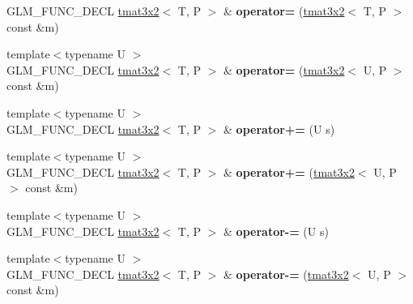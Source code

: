 \begin{DoxyCompactItemize}
\item 
\hypertarget{structglm_1_1detail_1_1tmat3x2_abba3dc67eea8c0f2ceeea5a66b892644}{G\-L\-M\-\_\-\-F\-U\-N\-C\-\_\-\-D\-E\-C\-L \hyperlink{structglm_1_1detail_1_1tmat3x2}{tmat3x2}$<$ T, P $>$ \& {\bfseries operator=} (\hyperlink{structglm_1_1detail_1_1tmat3x2}{tmat3x2}$<$ T, P $>$ const \&m)}\label{structglm_1_1detail_1_1tmat3x2_abba3dc67eea8c0f2ceeea5a66b892644}

\item 
\hypertarget{structglm_1_1detail_1_1tmat3x2_a14a1f4a49d2a1a04fa45935a33c47c3a}{{\footnotesize template$<$typename U $>$ }\\G\-L\-M\-\_\-\-F\-U\-N\-C\-\_\-\-D\-E\-C\-L \hyperlink{structglm_1_1detail_1_1tmat3x2}{tmat3x2}$<$ T, P $>$ \& {\bfseries operator=} (\hyperlink{structglm_1_1detail_1_1tmat3x2}{tmat3x2}$<$ U, P $>$ const \&m)}\label{structglm_1_1detail_1_1tmat3x2_a14a1f4a49d2a1a04fa45935a33c47c3a}

\item 
\hypertarget{structglm_1_1detail_1_1tmat3x2_a41d01c7fbc6061206a33b265ddb9649b}{{\footnotesize template$<$typename U $>$ }\\G\-L\-M\-\_\-\-F\-U\-N\-C\-\_\-\-D\-E\-C\-L \hyperlink{structglm_1_1detail_1_1tmat3x2}{tmat3x2}$<$ T, P $>$ \& {\bfseries operator+=} (U s)}\label{structglm_1_1detail_1_1tmat3x2_a41d01c7fbc6061206a33b265ddb9649b}

\item 
\hypertarget{structglm_1_1detail_1_1tmat3x2_a0ce859a11cdafb33342c159b4a4f145a}{{\footnotesize template$<$typename U $>$ }\\G\-L\-M\-\_\-\-F\-U\-N\-C\-\_\-\-D\-E\-C\-L \hyperlink{structglm_1_1detail_1_1tmat3x2}{tmat3x2}$<$ T, P $>$ \& {\bfseries operator+=} (\hyperlink{structglm_1_1detail_1_1tmat3x2}{tmat3x2}$<$ U, P $>$ const \&m)}\label{structglm_1_1detail_1_1tmat3x2_a0ce859a11cdafb33342c159b4a4f145a}

\item 
\hypertarget{structglm_1_1detail_1_1tmat3x2_a5ee8c2917c7b4e74c626af4cf49fce63}{{\footnotesize template$<$typename U $>$ }\\G\-L\-M\-\_\-\-F\-U\-N\-C\-\_\-\-D\-E\-C\-L \hyperlink{structglm_1_1detail_1_1tmat3x2}{tmat3x2}$<$ T, P $>$ \& {\bfseries operator-\/=} (U s)}\label{structglm_1_1detail_1_1tmat3x2_a5ee8c2917c7b4e74c626af4cf49fce63}

\item 
\hypertarget{structglm_1_1detail_1_1tmat3x2_a8c12556de23e4325c229e14f6c93888c}{{\footnotesize template$<$typename U $>$ }\\G\-L\-M\-\_\-\-F\-U\-N\-C\-\_\-\-D\-E\-C\-L \hyperlink{structglm_1_1detail_1_1tmat3x2}{tmat3x2}$<$ T, P $>$ \& {\bfseries operator-\/=} (\hyperlink{structglm_1_1detail_1_1tmat3x2}{tmat3x2}$<$ U, P $>$ const \&m)}\label{structglm_1_1detail_1_1tmat3x2_a8c12556de23e4325c229e14f6c93888c}


\end{DoxyCompactItemize}
